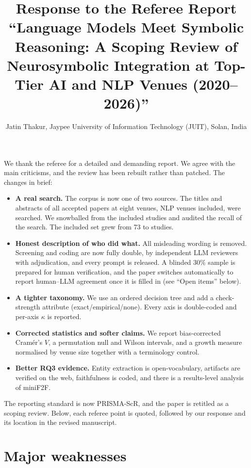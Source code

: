 \documentclass[10pt,a4paper]{article}
\title{Response to the Referee Report\\[2pt]\large ``Language Models Meet Symbolic Reasoning: A Scoping Review of Neurosymbolic Integration at Top-Tier AI and NLP Venues (2020--2026)''}
\author{Jatin Thakur, Jaypee University of Information Technology (JUIT), Solan, India}
\date{}
\begin{document}
\maketitle

We thank the referee for a detailed and demanding report. We agree with the main criticisms, and the review has been rebuilt rather than patched. The changes in brief:
\begin{itemize}
  \item \textbf{A real search.} The corpus is now one of two sources. The titles and abstracts of all  accepted papers at eight venues, NLP venues included, were searched. We snowballed from the included studies and audited the recall of the search. The included set grew from 73 to  studies.
  \item \textbf{Honest description of who did what.} All misleading wording is removed. Screening and coding are now fully double, by independent LLM reviewers with adjudication, and every prompt is released. A blinded 30\% sample is prepared for human verification, and the paper switches automatically to report human--LLM agreement once it is filled in (see ``Open items'' below).
  \item \textbf{A tighter taxonomy.} We use an ordered decision tree and add a check-strength attribute (exact/empirical/none). Every axis is double-coded and per-axis $\kappa$ is reported.
  \item \textbf{Corrected statistics and softer claims.} We report bias-corrected Cram\'er's $V$, a permutation null and Wilson intervals, and a growth measure normalised by venue size together with a terminology control.
  \item \textbf{Better RQ3 evidence.} Entity extraction is open-vocabulary, artifacts are verified on the web, faithfulness is coded, and there is a results-level analysis of miniF2F.
\end{itemize}
The reporting standard is now PRISMA-ScR, and the paper is retitled as a scoping review. Below, each referee point is quoted, followed by our response and its location in the revised manuscript.

\section*{Major weaknesses}
\end{document}

